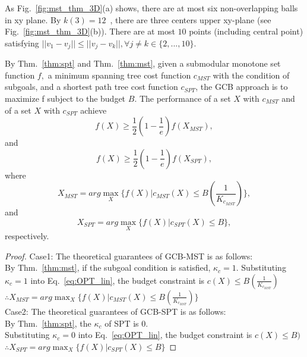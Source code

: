 As Fig.~\ref{fig:mst_thm_3D}(a) shows, there are at most six non-overlapping balls in xy plane.
By $k(3) = 12$~\cite{schutte1952problem}, there are three centers upper xy-plane (see Fig.~\ref{fig:mst_thm_3D}(b)).
There are at most $10$ points (including central point) satisfying $||v_1-v_j||\le||v_j-v_k||, \forall j \ne k \in\{2,...,10\}$.




\begin{theorem} 
By Thm.~\ref{thm:spt} and Thm.~\ref{thm:mst}, given a submodular monotone set function $f,$
a minimum spanning tree cost function $c_{MST}$ with the condition of subgoals,
and a shortest path tree cost function $c_{SPT}$,
the GCB approach is to maximize f subject to the budget $B$.
The performance of a set $X$ with $c_{MST}$ and of a set $X$ with $c_{SPT}$ achieve
\begin{equation}
  f(X)\ge\frac{1}{2}(1-\frac{1}{e})f(X_{MST}),
\end{equation}
and
\begin{equation}
  f(X)\ge\frac{1}{2}(1-\frac{1}{e})f(X_{SPT}),
\end{equation}
where
\begin{equation}
 X_{MST} = arg\max _X\{
f(X) | c_{MST}(X)\le B (\frac{1}{K_{c_{MST}}})
\},
\label{eq:SPT_k}
\end{equation}
and
\begin{equation}
 X_{SPT} = arg\max _X\{
f(X) | c_{SPT}(X)\le B
\},
\label{eq:MST_k}
\end{equation}
respectively.

\begin{proof}
Case1: The theoretical guarantees of GCB-MST is as follows:\\
By Thm.~\ref{thm:mst}, if the subgoal condition is satisfied, $\kappa_{c}=1$.
Substituting  $\kappa_{c}=1$ into Eq.~\ref{eq:OPT_lin}, the budget constraint is $c(X)\le B(\frac{1}{K_{c_{MST}}})$\\
$\therefore X_{MST} = arg\max _X\{
f(X) | c_{MST}(X)\le B (\frac{1}{K_{c_{MST}}})
\}$\\
Case2: The theoretical guarantees of GCB-SPT is as follows:\\
By Thm.~\ref{thm:spt}, the $\kappa_{c}$ of SPT is 0.\\
Substituting  $\kappa_{c}=0$ into Eq.~\ref{eq:OPT_lin}, the budget constraint is $c(X)\le B)$\\
$\therefore X_{SPT} = arg\max _X\{
f(X) | c_{SPT}(X)\le B
\}$


\end{proof}


\label{thm:sptmstGCB}
\end{theorem}

